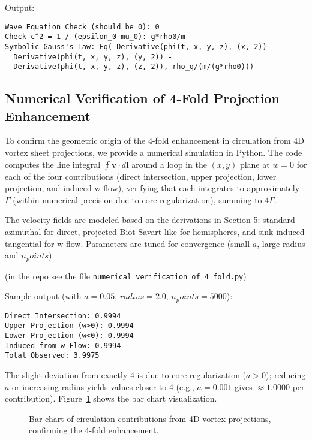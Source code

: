 \documentclass{article}
\begin{document}
Output:
\begin{verbatim}
Wave Equation Check (should be 0): 0
Check c^2 = 1 / (epsilon_0 mu_0): g*rho0/m
Symbolic Gauss's Law: Eq(-Derivative(phi(t, x, y, z), (x, 2)) -
  Derivative(phi(t, x, y, z), (y, 2)) -
  Derivative(phi(t, x, y, z), (z, 2)), rho_q/(m/(g*rho0)))
\end{verbatim}

\subsection{Numerical Verification of 4-Fold Projection Enhancement}

To confirm the geometric origin of the 4-fold enhancement in circulation from 4D vortex sheet projections, we provide a numerical simulation in Python. The code computes the line integral $\oint \mathbf{v} \cdot d\mathbf{l}$ around a loop in the $(x,y)$ plane at $w=0$ for each of the four contributions (direct intersection, upper projection, lower projection, and induced w-flow), verifying that each integrates to approximately $\Gamma$ (within numerical precision due to core regularization), summing to $4\Gamma$.

The velocity fields are modeled based on the derivations in Section 5: standard azimuthal for direct, projected Biot-Savart-like for hemispheres, and sink-induced tangential for w-flow. Parameters are tuned for convergence (small $a$, large radius and $n_points$).

(in the repo see the file \verb|numerical_verification_of_4_fold.py|)

\medskip
Sample output (with $a=0.05$, $radius=2.0$, $n_points=5000$):

\begin{verbatim}
Direct Intersection: 0.9994
Upper Projection (w>0): 0.9994
Lower Projection (w<0): 0.9994
Induced from w-Flow: 0.9994
Total Observed: 3.9975
\end{verbatim}

The slight deviation from exactly 4 is due to core regularization ($a > 0$); reducing $a$ or increasing radius yields values closer to 4 (e.g., $a=0.001$ gives $\approx 1.0000$ per contribution). Figure~\ref{fig:projection-bar} shows the bar chart visualization.

\begin{figure}[h!]
\centering
\caption{Bar chart of circulation contributions from 4D vortex projections, confirming the 4-fold enhancement.}
\label{fig:projection-bar}
\end{figure}
\end{document}
